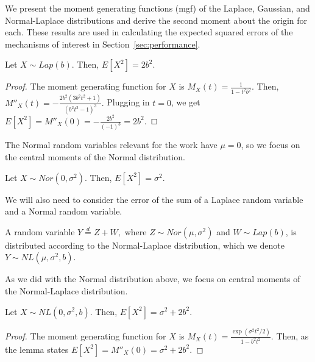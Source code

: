 We present the moment generating functions (mgf) of the Laplace, Gaussian, and Normal-Laplace distributions and derive the second moment about the origin for each. These results are used in calculating the expected squared errors of the mechanisms of interest in Section~\ref{sec:performance}. 

\begin{lem}
Let $X \sim Lap(b)$. Then, $E[X^2] = 2b^2.$
\end{lem}
\begin{proof}
The moment generating function for $X$ is $M_X(t) = \frac{1}{1 - t^2b^2}.$
Then, $M''_X(t) = -\frac{2b^2(3b^2t^2 + 1)}{(b^2t^2 - 1)^3}.$
Plugging in $t = 0$, we get 
$E[X^2] = M''_X(0) = -\frac{2b^2}{(-1)^3} = 2b^2.$
\end{proof}

The Normal random variables relevant for the work have $\mu = 0$, so we focus on the central moments of the Normal distribution.

\begin{lem}
Let $X \sim Nor(0, \sigma^2)$. Then,
$E[X^2] = \sigma^2.$
\end{lem}

We will also need to consider the error of the sum of a Laplace random variable and a Normal random variable. %
\begin{defn}
A random variable $Y \overset{d}{=} Z + W,$ where $Z \sim Nor(\mu, \sigma^2)$ and $W \sim Lap(b)$, is distributed according to the Normal-Laplace distribution, which we denote $Y \sim NL(\mu, \sigma^2, b)$.
\end{defn}

As we did with the Normal distribution above, we focus on central moments of the Normal-Laplace distribution.
\begin{lem}
\label{nl_secmom}
Let $X \sim NL(0, \sigma^2, b)$. Then, 
$E[X^2] = \sigma^2 + 2b^2.$
\end{lem}
\begin{proof}
The moment generating function for $X$ is
$M_X(t) = \frac{\exp(\sigma^2t^2/2)}{1 - b^2t^2}.$
Then, as the lemma states
$E[X^2] = M''_X(0) = \sigma^2 + 2b^2.$
\end{proof}

